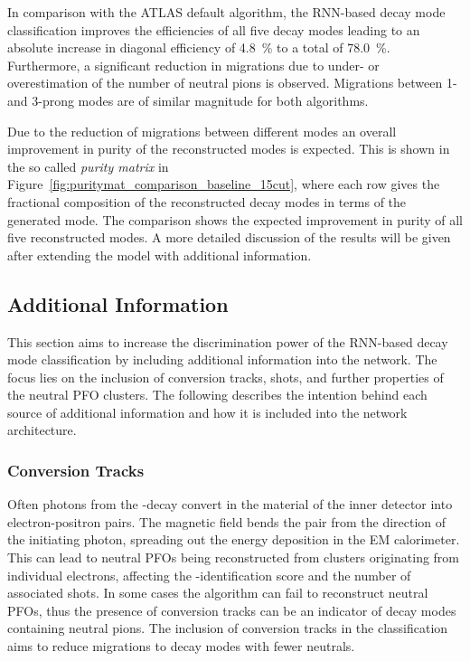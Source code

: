 In comparison with the ATLAS default algorithm, the RNN-based decay mode
classification improves the efficiencies of all five decay modes leading to an
absolute increase in diagonal efficiency of \SI{4.8}{\percent} to a total of
\SI{78.0}{\percent}. Furthermore, a significant reduction in migrations due to
under- or overestimation of the number of neutral pions is observed. Migrations
between 1- and 3-prong modes are of similar magnitude for both algorithms.

Due to the reduction of migrations between different modes an overall
improvement in purity of the reconstructed modes is expected. This is shown in
the so called \emph{purity matrix} in
Figure~\ref{fig:puritymat_comparison_baseline_15cut}, where each row gives the
fractional composition of the reconstructed decay modes in terms of the
generated mode. The comparison shows the expected improvement in purity of all
five reconstructed modes. A more detailed discussion of the results will be
given after extending the model with additional information.

\subsection{Additional Information}
\label{sec:add_info}

This section aims to increase the discrimination power of the RNN-based decay
mode classification by including additional information into the network. The
focus lies on the inclusion of conversion tracks, shots, and further properties
of the neutral PFO clusters. The following describes the intention behind each
source of additional information and how it is included into the network
architecture.

\subsubsection{Conversion Tracks}
Often photons from the -decay convert in the material of the
inner detector into electron-positron pairs. The magnetic field bends the pair
from the direction of the initiating photon, spreading out the energy deposition
in the EM calorimeter. This can lead to neutral PFOs being reconstructed from
clusters originating from individual electrons, affecting the
-identification score and the number of associated shots. In some
cases the algorithm can fail to reconstruct neutral PFOs, thus the presence of
conversion tracks can be an indicator of decay modes containing neutral pions.
The inclusion of conversion tracks in the classification aims to reduce
migrations to decay modes with fewer neutrals.

